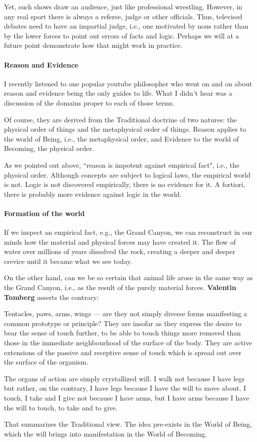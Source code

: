 Yet, such shows draw an audience, just like professional wrestling. However, in any real sport there is always a referee, judge or other officials. Thus, televised debates need to have an impartial judge, i.e., one motivated by nous rather than by the lower forces to point out errors of facts and logic. Perhaps we will at a future point demonstrate how that might work in practice.

\paragraph{Reason and Evidence}
I recently listened to one popular youtube philosopher who went on and on about reason and evidence being the only guides to life. What I didn't hear was a discussion of the domains proper to each of those terms.

Of course, they are derived from the Traditional doctrine of two natures: the physical order of things and the metaphysical order of things. Reason applies to the world of Being, i.e., the metaphysical order, and Evidence to the world of Becoming, the physical order.

As we pointed out above, ``reason is impotent against empirical fact", i.e., the physical order. Although concepts are subject to logical laws, the empirical world is not. Logic is not discovered empirically, there is no evidence for it. A fortiori, there is probably more evidence against logic in the world.

\paragraph{Formation of the world}
If we inspect an empirical fact, e.g., the Grand Canyon, we can reconstruct in our minds how the material and physical forces may have created it. The flow of water over millions of years dissolved the rock, creating a deeper and deeper crevice until it became what we see today.

On the other hand, can we be so certain that animal life arose in the same way as the Grand Canyon, i.e., as the result of the purely material forces. \textbf{Valentin Tomberg} asserts the contrary:

\begin{quotex}
Tentacles, paws, arms, wings — are they not simply diverse forms manifesting a common prototype or principle? They are insofar as they express the desire to bear the sense of touch further, to be able to touch things more removed than those in the immediate neighbourhood of the surface of the body. They are active extensions of the passive and receptive sense of touch which is spread out over the surface of the organism.

The organs of action are simply crystallized will. I walk not because I have legs but rather, on the contrary, I have legs because I have the will to move about. I touch, I take and I give not because I have arms, but I have arms because I have the will to touch, to take and to give. 

\end{quotex}
That summarizes the Traditional view. The idea pre-exists in the World of Being, which the will brings into manifestation in the World of Becoming.

